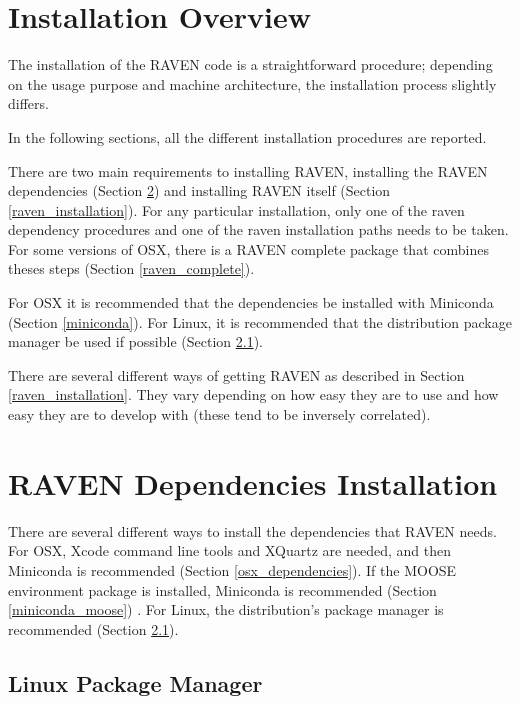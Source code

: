 \section{Installation Overview}

The installation of the RAVEN code is a straightforward procedure;
depending on the usage purpose and machine architecture, the
installation process slightly differs.

In the following sections, all the different installation procedures
are reported.

There are two main requirements to installing RAVEN, installing the
RAVEN dependencies (Section \ref{raven_dependencies}) and installing
RAVEN itself (Section \ref{raven_installation}).  For any particular
installation, only one of the raven dependency procedures and one of
the raven installation paths needs to be taken. For some versions of
OSX, there is a RAVEN complete package that combines theses steps
(Section \ref{raven_complete}).

For OSX it is recommended that the dependencies be installed with
Miniconda (Section \ref{miniconda}).  For Linux, it is recommended
that the distribution package manager be used if possible (Section
\ref{linux_package_manager}).

There are several different ways of getting RAVEN as described in
Section \ref{raven_installation}.  They vary depending on how easy
they are to use and how easy they are to develop with (these tend to
be inversely correlated).

\newcommand{\goToRavenInstallation}{Now go on to Section \ref{raven_installation} for Raven installation.
}


\section{RAVEN Dependencies Installation}
\label{raven_dependencies}

There are several different ways to install the dependencies that
RAVEN needs.  For OSX, Xcode command line tools and XQuartz are
needed, and then Miniconda is recommended (Section
\ref{osx_dependencies}).  If the MOOSE environment package is
installed, Miniconda is recommended (Section \ref{miniconda_moose}) .
For Linux, the distribution's package manager is recommended (Section
\ref{linux_package_manager}).

\subsection{Linux Package Manager}
\label{linux_package_manager}

